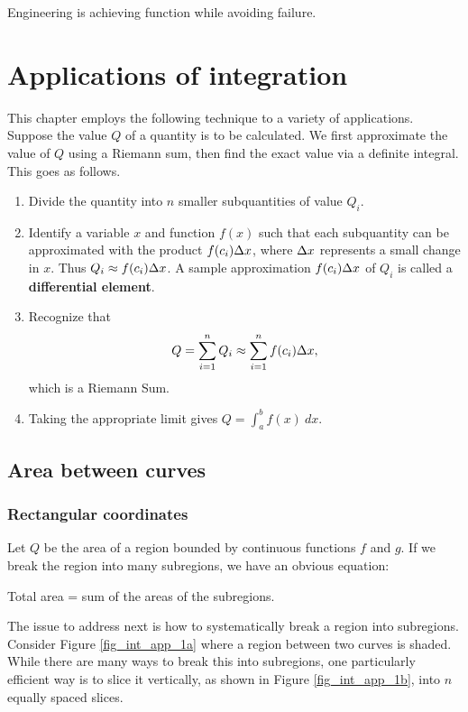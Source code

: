 \begin{savequote}[75mm]
Engineering is achieving function while avoiding failure. 
\end{savequote}

\chapter{Applications of integration}
\label{chap_int_app}
\graphicspath{{figures/Int_App/}}


This chapter employs the following technique to a variety of applications. Suppose the value $Q$ of a quantity is to be calculated. We first approximate the value of $Q$ using a Riemann sum, then find the exact value via a definite integral. This goes as follows.


\begin{enumerate}
\item		Divide the quantity into $n$ smaller subquantities of value $Q_i$.
\item		Identify a variable $x$ and function $f(x)$ such that each subquantity can be approximated with the product $f(c_i)\Delta x$, where $\Delta x$ represents a small change in $x$. Thus $Q_i \approx f(c_i)\Delta x$. A sample approximation $f(c_i)\Delta x$ of $Q_i$ is called a \textbf{differential element}.
\item		Recognize that $$\displaystyle Q= \sum_{i=1}^n Q_i \approx \sum_{i=1}^n f(c_i)\Delta x,$$ which is a Riemann Sum.
\item		Taking the appropriate limit gives $Q = \int_a^b f(x)\ dx.$
\end{enumerate}

\section{Area between curves}\label{sec:ABC}
\subsection{Rectangular coordinates}
Let $Q$ be the area of a region bounded by continuous functions $f$ and $g$. If we break the region into many subregions, we have an obvious equation:

\hfill Total area = sum of the areas of the subregions. \hfill \null

The issue to address next is how to systematically break a region into subregions. Consider Figure \ref{fig_int_app_1a}  where a region between two curves is shaded. While there are many ways to break this into subregions, one particularly efficient way is to slice it vertically, as shown in Figure \ref{fig_int_app_1b}, into $n$ equally spaced slices. 

